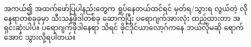 \begin{mytcbox}
အကယ်၍ အထက်ဖော်ပြပါနည်းတွေက ရှုပ်နေတယ်ထင်ရင်  မှတ်ရ/သွားရ လွယ်တဲ့  လို နေရာတစ်ခုခုမှာ  သီးသန့်ဖိုဒါတစ်ခု ဆောက်ပြီး ပရောဂျက်အားလုံး ထည့်ထားတာ အရှင်းဆုံးပါပဲ။ ပရောဂျက်ဖိုဒါနေရာ သိရင် ဖိုင်ဒိုင်ယာလော့ဂ်ကနေ ဘယ်လိုမဆို ရောက်အောင် သွားလို့ရပါတယ်။
\end{mytcbox}

\begin{figure}[tbh!]
\caption{} 
\label{fig:pstepth}
\end{figure}

\begin{figure}[tbh!]
\caption{} 
\label{fig:prjwlds}
\end{figure}



